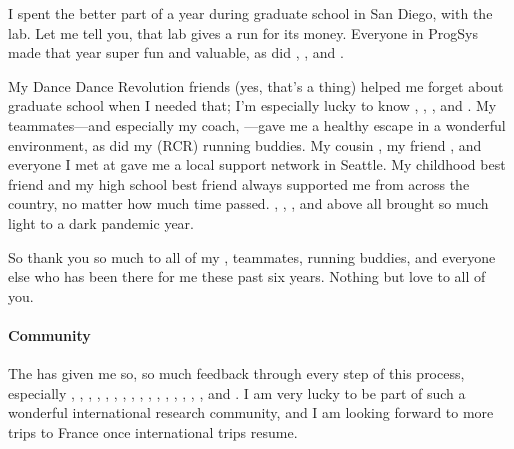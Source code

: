 I spent the better part of a year during graduate school in San Diego, with the  lab.
Let me tell you, that lab gives  a run for its money.
Everyone in ProgSys made that year super fun and valuable,
as did , , and .

My Dance Dance Revolution friends (yes, that's a thing) helped me forget about graduate school when I needed that;
I'm especially lucky to know , , , and .
My  teammates---and especially my coach, ---gave me a healthy escape in a wonderful environment,
as did my  (RCR) running buddies.
My cousin , my friend , and everyone I met at  gave me a local support network in Seattle.
My childhood best friend  and my high school best friend  always supported me from across the country,
no matter how much time passed. , , , and above all  brought so much light to a dark pandemic year.

So thank you so much to all of my ,  teammates,  running buddies, and everyone else who has been there for me these past six years.
Nothing but love to all of you.

\paragraph{Community}
The  has given me so, so much feedback through every step of this process,
especially , , , , , , , , , , , , , , , , and .
I am very lucky to be part of such a wonderful international research community, and I am looking forward to more trips to France
once international trips resume.

